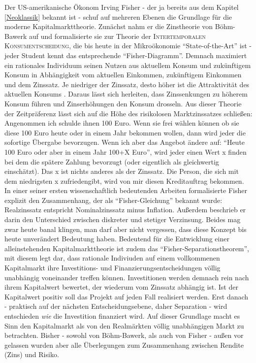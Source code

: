 Der US-amerikanische Ökonom Irving Fisher - der ja bereits aus dem Kapitel \ref{Neoklassik} bekannt ist - schuf auf mehreren Ebenen die Grundlage für die moderne Kapitalmarkttheorie. Zunächst nahm er die Zinstheorie von Böhm-Bawerk auf und formalisierte sie zur Theorie der \textsc{Intertemporalen Konsumentscheidung}, die bis heute in der Mikroökonomie "`State-of-the-Art"' ist - jeder Student kennt das entsprechende "`Fisher-Diagramm"'. Demnach maximiert ein rationales Individuum seinen Nutzen aus aktuellem Konsum und zukünftigem Konsum in Abhängigkeit vom aktuellen Einkommen, zukünftigem Einkommen und dem Zinssatz. Je niedriger der Zinssatz, desto höher ist die Attraktivität des aktuellen Konsums \parencite{Fisher1930}. Daraus lässt sich herleiten, dass Zinssenkungen zu höherem Konsum führen und Zinserhöhungen den Konsum drosseln. Aus dieser Theorie der Zeitpräferenz lässt sich auf die Höhe des risikolosen Marktzinssatzes schließen: Angenommen ich schulde ihnen 100 Euro. Wenn sie frei wählen können ob sie diese 100 Euro heute oder in einem Jahr bekommen wollen, dann wird jeder die sofortige Übergabe bevorzugen. Wenn ich aber das Angebot ändere auf: "`Heute 100 Euro oder aber in einem Jahr 100+X Euro"', wird jeder einen Wert x finden bei dem die spätere Zahlung bevorzugt (oder eigentlich als gleichwertig einschätzt). Das x ist nichts anderes als der Zinssatz. Die Person, die sich mit dem niedrigsten x zufriedengibt, wird von mir diesen Kreditauftrag bekommen. In einer seiner ersten wissenschaftlich bedeutenden Arbeiten formalisierte Fisher explizit den Zusammenhang, der als "`Fisher-Gleichung"' bekannt wurde: Realzinssatz entspricht Nominalzinssatz minus Inflation. Außerdem beschrieb er darin den Unterschied zwischen diskreter und stetiger Verzinsung\parencite[S. 191ff]{Fisher1906}. Beides mag zwar heute banal klingen, man darf aber nicht vergessen, dass diese Konzept bis heute unverändert Bedeutung haben. Bedeutend für die Entwicklung einer alleinstehenden Kapitalmarkttheorie ist zudem das "`Fisher-Separationstheorem"', mit diesem legt \textcite[S. 125f]{Fisher1930} dar, dass rationale Indiviuden auf einem vollkommenen Kapitalmarkt ihre Investitions- und Finanzierungsentscheidungen völlig unabhängig voneinander treffen können. Investitionen werden demnach rein nach ihrem Kapitalwert bewertet, der wiederum vom Zinssatz abhängig ist. Ist der Kapitalwert positiv soll das Projekt auf jeden Fall realisiert werden. Erst danach - praktisch auf der nächsten Entscheidungsebene, daher Separation - wird entschieden \textit{wie} die Investition finanziert wird. Auf dieser Grundlage macht es Sinn den Kapitalmarkt als von den Realmärkten völlig unabhängigen Markt zu betrachten. Bisher - sowohl von Böhm-Bawerk, als auch von Fisher - außen vor gelassen wurden aber alle Überlegungen zum Zusammenhang zwischen Rendite (Zins) und Risiko.

